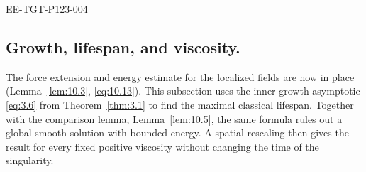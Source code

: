 \begin{EESegment}{EE-TGT-P123-004}
\subsection{Growth, lifespan, and viscosity.}\label{sec:10.4}
The force extension and energy estimate for the localized fields
 are now in place (Lemma~\ref{lem:10.3},
\eqref{eq:10.13}). This subsection uses the inner growth asymptotic \eqref{eq:3.6} from
Theorem~\ref{thm:3.1} to find the maximal classical lifespan. Together with the comparison
lemma, Lemma~\ref{lem:10.5}, the same formula rules out a global smooth solution with
bounded energy. A spatial rescaling then gives the result for every fixed positive viscosity
without changing the time of the singularity.
\end{EESegment}

